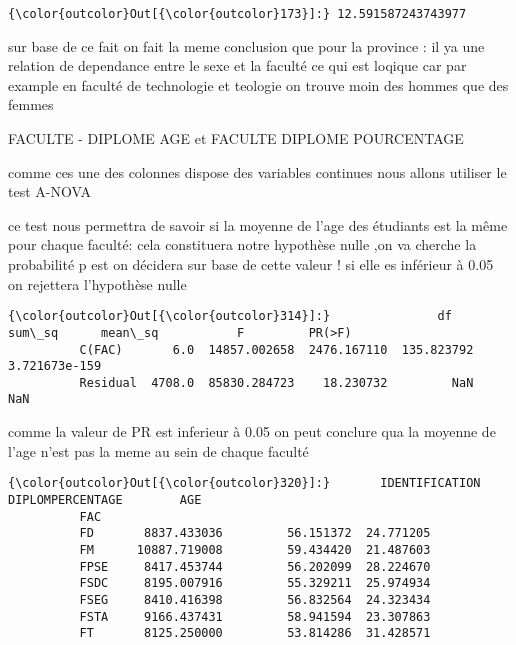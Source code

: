 \documentclass[11pt]{article}
\begin{document}
            \begin{Verbatim}[commandchars=\\\{\}]
{\color{outcolor}Out[{\color{outcolor}173}]:} 12.591587243743977
\end{Verbatim}
        
    sur base de ce fait on fait la meme conclusion que pour la province : il
ya une relation de dependance entre le sexe et la faculté ce qui est
loqique car par example en faculté de technologie et teologie on trouve
moin des hommes que des femmes

    FACULTE - DIPLOME AGE et FACULTE DIPLOME POURCENTAGE

    comme ces une des colonnes dispose des variables continues nous allons
utiliser le test A-NOVA

    ce test nous permettra de savoir si la moyenne de l'age des étudiants
est la même pour chaque faculté: cela constituera notre hypothèse nulle
,on va cherche la probabilité p est on décidera sur base de cette valeur
! si elle es inférieur à 0.05 on rejettera l'hypothèse nulle

            \begin{Verbatim}[commandchars=\\\{\}]
{\color{outcolor}Out[{\color{outcolor}314}]:}               df        sum\_sq      mean\_sq           F         PR(>F)
          C(FAC)       6.0  14857.002658  2476.167110  135.823792  3.721673e-159
          Residual  4708.0  85830.284723    18.230732         NaN            NaN
\end{Verbatim}
        
    comme la valeur de PR est inferieur à 0.05 on peut conclure qua la
moyenne de l'age n'est pas la meme au sein de chaque faculté

            \begin{Verbatim}[commandchars=\\\{\}]
{\color{outcolor}Out[{\color{outcolor}320}]:}       IDENTIFICATION  DIPLOMPERCENTAGE        AGE
          FAC                                              
          FD       8837.433036         56.151372  24.771205
          FM      10887.719008         59.434420  21.487603
          FPSE     8417.453744         56.202099  28.224670
          FSDC     8195.007916         55.329211  25.974934
          FSEG     8410.416398         56.832564  24.323434
          FSTA     9166.437431         58.941594  23.307863
          FT       8125.250000         53.814286  31.428571
\end{Verbatim}
        
\end{document}
